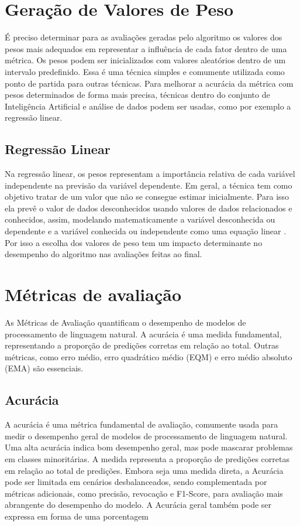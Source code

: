 \section{Geração de Valores de Peso}
É preciso determinar para as avaliações geradas pelo algoritmo os valores dos pesos mais adequados em representar a influência de cada fator dentro de uma métrica. Os pesos podem ser inicializados com valores aleatórios dentro de um intervalo predefinido. Essa é uma técnica simples e comumente utilizada como ponto de partida para outras técnicas. Para melhorar a acurácia da métrica com pesos determinados de forma mais precisa, técnicas dentro do conjunto de Inteligência Artificial e análise de dados podem ser usadas, como por exemplo a regressão linear.

\subsection{Regressão Linear}
Na regressão linear, os pesos representam a importância relativa de cada variável independente na previsão da variável dependente. Em geral, a técnica tem como objetivo tratar de um valor que não se consegue estimar inicialmente. Para isso ela prevê o valor de dados desconhecidos usando valores de dados relacionados e conhecidos, assim, modelando matematicamente a variável desconhecida ou dependente e a variável conhecida ou independente como uma equação linear \cite{ML}. Por isso a escolha dos valores de peso tem um impacto determinante no desempenho do algoritmo nas avaliações feitas ao final.

\section{Métricas de avaliação}
As Métricas de Avaliação quantificam o desempenho de modelos de processamento de linguagem natural. A acurácia é uma medida fundamental, representando a proporção de predições corretas em relação ao total. Outras métricas, como erro médio, erro quadrático médio (EQM) e erro médio absoluto (EMA) são essenciais.

\subsection{Acurácia}
A acurácia é uma métrica fundamental de avaliação, comumente usada para medir o desempenho geral de modelos de processamento de linguagem natural. Uma alta acurácia indica bom desempenho geral, mas pode mascarar problemas em classes minoritárias. A medida representa a proporção de predições corretas em relação ao total de predições. Embora seja uma medida direta, a Acurácia pode ser limitada em cenários desbalanceados, sendo complementada por métricas adicionais, como precisão, revocação e F1-Score, para avaliação mais abrangente do desempenho do modelo. A Acurácia geral também pode ser expressa em forma de uma porcentagem

